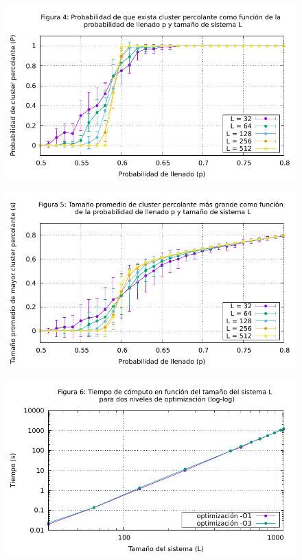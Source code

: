 \documentclass{article}
\begin{document}
\begin{figure}[h!]
    \begin{center}
    \includegraphics[scale=0.9]{prob.pdf}
    \end{center}
\end{figure}

\begin{figure}[h!]
    \begin{center}
    \includegraphics[scale=0.9]{size.pdf}
    \end{center}
\end{figure}

\begin{figure}[h!]
    \begin{center}
    \includegraphics[scale=0.9]{time.pdf}
    \end{center}
\end{figure}
\end{document}
